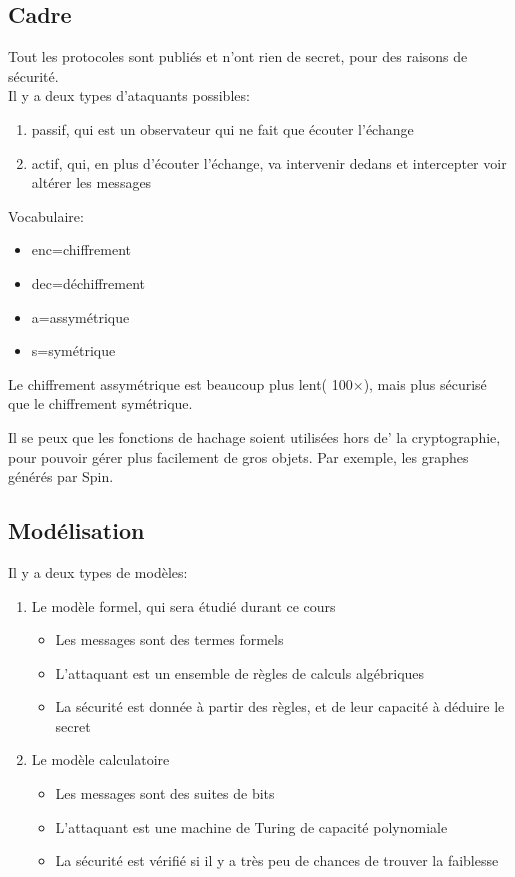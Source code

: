 \subsection{Cadre}
Tout les protocoles sont publiés et n'ont rien de secret, pour des raisons de sécurité.\\
Il y a deux types d'ataquants possibles:
\begin{enumerate}
	\item passif, qui est un observateur qui ne fait que écouter l'échange
	\item actif, qui, en plus d'écouter l'échange, va intervenir dedans et intercepter voir altérer les messages
\end{enumerate}

Vocabulaire:
\begin{itemize}
	\item enc=chiffrement
	\item dec=déchiffrement
	\item a=assymétrique
	\item s=symétrique
\end{itemize}
Le chiffrement assymétrique est beaucoup plus lent( 100$\times$), mais plus sécurisé que le chiffrement symétrique.

Il se peux que les fonctions de hachage soient utilisées hors de' la cryptographie, pour pouvoir gérer plus facilement
de gros objets. Par exemple, les graphes générés par Spin.

\subsection{Modélisation}
Il y a deux types de modèles:
\begin{enumerate}
	\item Le modèle formel, qui sera étudié durant ce cours
	\begin{itemize}
		\item Les messages sont des termes formels
		\item L'attaquant est un ensemble de règles de calculs algébriques
		\item La sécurité est donnée à partir des règles, et de leur capacité à déduire le secret
	\end{itemize}
	\item Le modèle calculatoire
	\begin{itemize}
		\item Les messages sont des suites de bits
		\item L'attaquant est une machine de Turing de capacité polynomiale
		\item La sécurité est vérifié si il y a très peu de chances de trouver la faiblesse
	\end{itemize}
\end{enumerate}

